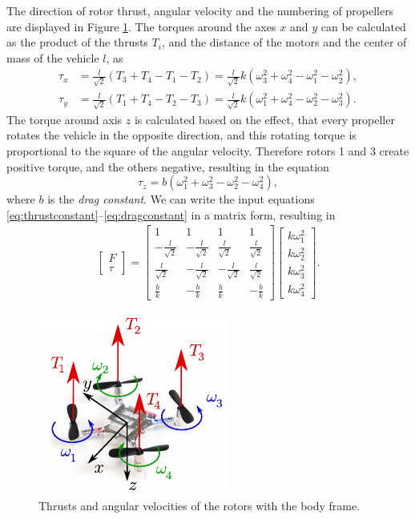 The direction of rotor thrust, angular velocity and the numbering of propellers are displayed in Figure \ref{fig:input_eqs}. The torques around the axes $x$ and $y$ can be calculated as the product of the thrusts $T_i$, and the distance of the motors and the center of mass of the vehicle $l$, as
\begin{align}
\tau_x &= \frac{l}{\sqrt{2}}(T_3+T_4-T_1-T_2) =  \frac{l}{\sqrt{2}} k \left(\omega_3^2+\omega_4^2-\omega_1^2-\omega_2^2\right),\\
\tau_y &= \frac{l}{\sqrt{2}}(T_1+T_4-T_2-T_3) =  \frac{l}{\sqrt{2}}k \left(\omega_1^2+\omega_4^2-\omega_2^2-\omega_3^2\right).
\end{align}
The torque around axis $z$ is calculated based on the effect, that every propeller rotates the vehicle in the opposite direction, and this rotating torque is proportional to the square of the angular velocity. Therefore rotors 1 and 3 create positive torque, and the others negative, resulting in the equation
\begin{equation}\label{eq:dragconstant}
\tau_z = b\left(\omega_1^2+\omega_3^2-\omega_2^2-\omega_4^2\right),
\end{equation}
where $b$ is the \textit{drag constant}. We can write the input equations \eqref{eq:thrustconstant}--\eqref{eq:dragconstant} in a matrix form, resulting in
\begin{align}\label{eq:inputs}
\begin{bmatrix}F \\ \tau\end{bmatrix}=\begin{bmatrix}1 & 1 & 1 & 1 \\ -\frac{l}{\sqrt{2}} &  -\frac{l}{\sqrt{2}} &  \frac{l}{\sqrt{2}} &  \frac{l}{\sqrt{2}} \\  \frac{l}{\sqrt{2}} & -\frac{l}{\sqrt{2}} &  -\frac{l}{\sqrt{2}} &  \frac{l}{\sqrt{2}} \\ \frac{b}{k} & -\frac{b}{k} & \frac{b}{k} & -\frac{b}{k}\end{bmatrix}\begin{bmatrix} k \omega_{1}^{2} \\ k \omega_{2}^{2} \\ k \omega_{3}^{2} \\ k \omega_{4}^{2}\end{bmatrix}.
\end{align}

\begin{figure}
\centering 
\includegraphics[width=.3\textwidth]{Fig/input_eqs.pdf}
\caption{Thrusts and angular velocities of the rotors with the body frame.}\label{fig:input_eqs}
\end{figure}

